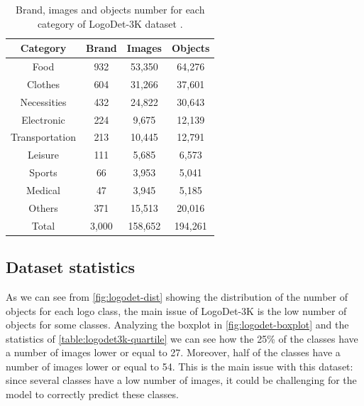 \begin{table}
    \centering
    \begin{tabular}{c | c  c  c } 
     \hline
     \textbf{Category} & \textbf{Brand} & \textbf{Images} & \textbf{Objects} \\
     \hline
    Food & 932 & 53,350 & 64,276 \\ 
    Clothes & 604 & 31,266 & 37,601 \\ 
    Necessities & 432 & 24,822 & 30,643 \\ 
    Electronic & 224 & 9,675 & 12,139 \\ 
    Transportation & 213 & 10,445 & 12,791 \\ 
    Leisure & 111 & 5,685 & 6,573 \\ 
    Sports & 66 & 3,953 & 5,041 \\ 
    Medical & 47 & 3,945 & 5,185 \\ 
    Others & 371 & 15,513 & 20,016 \\ 
    \hline
    Total & 3,000 & 158,652 & 194,261 \\ 

    \end{tabular}
    \caption{Brand, images and objects number for each category of LogoDet-3K dataset \cite{wang2022logodet}.}
    \label{table:logodet3k-category-statistics}
\end{table}

\subsection{Dataset statistics}
\label{sec:dataset-stat}
As we can see from \autoref{fig:logodet-dist} showing the distribution of the number of objects for each logo class, the main issue of LogoDet-3K is the low number of objects for some classes. Analyzing the boxplot in \autoref{fig:logodet-boxplot} and the statistics of \autoref{table:logodet3k-quartile} we can see how the 25\% of the classes have a number of images lower or equal to 27. Moreover, half of the classes have a number of images lower or equal to 54. This is the main issue with this dataset: since several classes have a low number of images, it could be challenging for the model to correctly predict these classes.  

